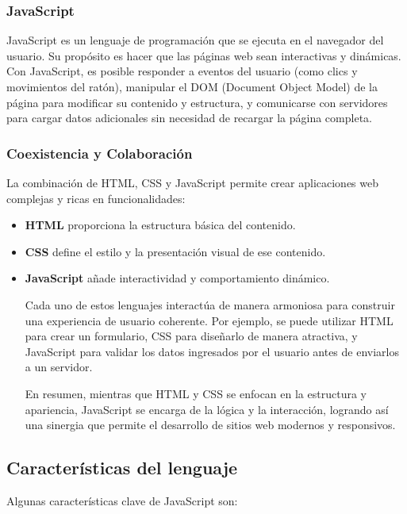 \documentclass{book}
\begin{document}
\subsubsection{JavaScript}

JavaScript\cite{mdn_js} es un lenguaje de programación que se ejecuta en el navegador del usuario. Su propósito es hacer que las páginas web sean interactivas y dinámicas. Con JavaScript, es posible responder a eventos del usuario (como clics y movimientos del ratón), manipular el DOM (Document Object Model) de la página para modificar su contenido y estructura, y comunicarse con servidores para cargar datos adicionales sin necesidad de recargar la página completa.

\subsubsection{Coexistencia y Colaboración}

La combinación de HTML, CSS y JavaScript permite crear aplicaciones web complejas y ricas en funcionalidades:

\begin{itemize}
    \item \textbf{HTML} proporciona la estructura básica del contenido.
    \item \textbf{CSS} define el estilo y la presentación visual de ese contenido.
    \item \textbf{JavaScript} añade interactividad y comportamiento dinámico.

Cada uno de estos lenguajes interactúa de manera armoniosa para construir una experiencia de usuario coherente. Por ejemplo, se puede utilizar HTML para crear un formulario, CSS para diseñarlo de manera atractiva, y JavaScript para validar los datos ingresados por el usuario antes de enviarlos a un servidor.

En resumen, mientras que HTML y CSS se enfocan en la estructura y apariencia, JavaScript se encarga de la lógica y la interacción, logrando así una sinergia que permite el desarrollo de sitios web modernos y responsivos.
\end{itemize}


\subsection{Características del lenguaje}

Algunas características clave de JavaScript son:
\end{document}
